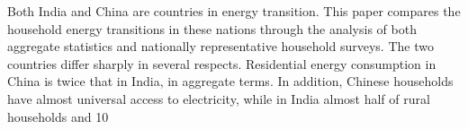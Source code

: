 Both India and China are countries in energy transition. This paper compares the household energy transitions in these nations through the analysis of both aggregate statistics and nationally representative household surveys. The two countries differ sharply in several respects. Residential energy consumption in China is twice that in India, in aggregate terms. In addition, Chinese households have almost universal access to electricity, while in India almost half of rural households and 10%